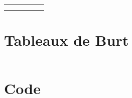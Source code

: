 \documentclass{article}
\begin{document}
\begin{lstlisting}[numbers=none] 
\end{lstlisting}

\begin{lstlisting}[numbers=none]
\end{lstlisting}

\begin{lstlisting}[numbers=none]
\end{lstlisting}

\begin{lstlisting}[numbers=none]
\end{lstlisting}


\newpage


\begin{table}[h!]  %
    \centering
    \begin{tabular}{l|c|c|c|c}
        &  &  &  & \\ \hline
        &  &  &  & \\
        &  &  &  & \\
    \end{tabular}
\end{table}


\section{Tableaux de Burt}

\begin{lstlisting}[numbers=none]
\end{lstlisting}

\begin{figure}[h!] %
    \centering
\end{figure}


%
%
%
%
%

\newpage
\appendix

\section{Code}
%
\end{document}
